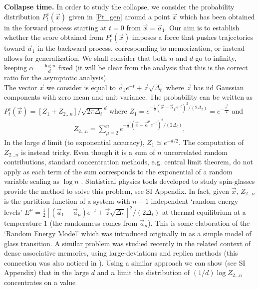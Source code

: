 \documentclass[10pt,twocolumn]{article}
\newcommand{\vx}{\vec x}
\newcommand{\va}{\vec a}
\begin{document}
{\bf Collapse time.}
In order to study the collapse, we consider the probability distribution $P_t^e(\vec x)$ given in \eqref{Pt_gen} around a point $\vec x$ which has been obtained in the forward process starting at $t=0$ from $\vec x=\vec a_1$. Our aim is to establish whether the score obtained from $P_t^e(\vec x)$ imposes a force that pushes trajectories toward $\vec a_1$ in the backward process, corresponding to memorization, or instead allows for generalization. We shall consider that both $n$ and $d$ go to infinity, keeping $\alpha=\frac{\log n}{d}$ fixed (it will be clear from the analysis that this is the correct ratio for the asymptotic analysis).\\  
The vector $\vec x$ we consider is equal to $\vec a_1 e^{-t}+\vec z \sqrt{\Delta_t}$ where $\vec z$ has iid Gaussian components with zero mean and unit variance. The probability can be written as 
$P_t^e(\vx)= \left[Z_1+Z_{2...n}\right]/\sqrt{2\pi\Delta_t}^d$ where $Z_1= e^{-\frac{1}{2}(\vx-\va_1 e^{-t})^2/(2\Delta_t)}= e^{-\frac{\vec z^2}{2}}$
and
\begin{align}
    Z_{2...n}= \sum_{\mu=2}^n e^{-\frac{1}{2}[(\vx-\va^\mu e^{-t})^2/(2\Delta_t)},
\label{Zrem}
\end{align}
In the large $d$ limit (to exponential accuracy), $Z_1\simeq e^{-d/2}$. The computation of $Z_{2...n}$ is instead tricky. Even though it is a sum of $n$ uncorrelated random contributions, standard concentration methods, e.g. central limit theorem, do not apply as each term of the sum corresponds to the exponential of a random variable scaling as $\log n$ \cite{ben2005limit}.  Statistical physics tools developed to study spin-glasses provide the method to solve this problem, see SI Appendix. In fact, given $\vx$, $Z_{2...n}$ is the partition function of a system with $n-1$ independent `random energy levels' $E^\mu =\frac{1}{2}\left[(\va_1-\va_\mu) e^{-t}+\vec z \sqrt{\Delta_t}\right]^2/(2\Delta_t)$ at thermal equilibrium at a temperature $1$ (the randomness comes from $\va_\mu$). This is some elaboration of the `Random Energy Model' which was introduced originally in \cite{derrida1981random} as a simple model of glass transition. A similar problem \cite{lucibello2023exponential} was studied recently in the related context of dense associative memories, using large-deviations and replica  methods (this connection was also noticed in \cite{ambrogioni_stat_thermo}). Using a similar approach we can show (see SI Appendix) that in the large $d$ and $n$ limit the distribution of $(1/d)\log Z_{2...n}$ concentrates on a value
\end{document}
